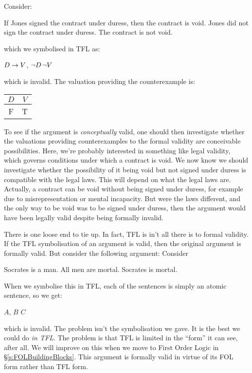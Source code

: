 Consider:
%
\begin{earg}
\prem If Jones signed the contract under duress, then the
contract is void.
\prem Jones did not sign the contract under duress.
\conc The contract is not void.
\end{earg}which we symbolised in TFL as:
\begin{center}
$D\rightarrow V$,\; $\neg D$\;\therefore\;$\neg V$
\end{center}
which is invalid. The valuation providing the counterexample is:
\begin{tabular}{cc}
$D$&$V$\\\hline
F&T
\end{tabular} To see if the argument is \emph{conceptually} valid, one should then investigate whether the valuations providing counterexamples to the formal validity are conceivable possibilities. Here, we're probably interested in something like legal validity, which governs conditions under which a contract is void. We now know we should investigate whether the possibility of it being void but not signed under duress is compatible with the legal laws.
This will depend on what the legal laws are.
Actually, a contract can be void without being signed under duress, for example due to misrepresentation or mental incapacity.
But were the laws different, and the only way to be void was to be signed under duress, then the argument would have been legally valid despite being formally invalid.


There is one loose end to tie up. In fact, TFL is in't all there is to formal validity.
If the TFL symbolisation of an argument is valid, then the original argument is formally valid. But consider the following argument:
Consider
\begin{earg}
\prem Socrates is a man.
\prem All men are mortal.
\conc Socrates is mortal.
\end{earg}
When we symbolise this in TFL, each of the sentences is simply an atomic sentence, so we get:
\begin{center}
$A$, $B$\; \therefore \; $C$
\end{center}
which is invalid.
The problem isn't the symbolisation we gave. It is the best we could do \emph{in TFL}. The problem is that TFL is limited in the ``form'' it can see, after all. We will improve on this when we move to First Order Logic in \S\ref{s:FOLBuildingBlocks}.
This argument is formally valid in virtue of its FOL form rather than TFL form.


